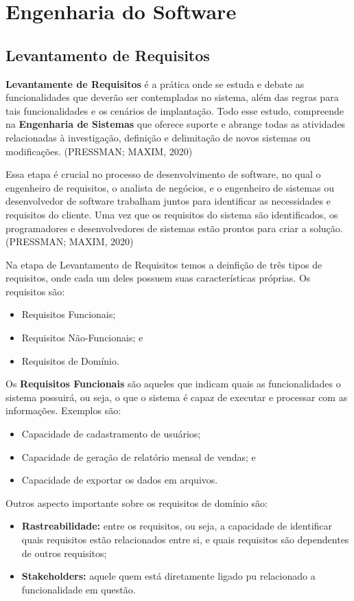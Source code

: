 \documentclass[a4paper,12pt]{article}
\begin{document}
\pagebreak
\section{Engenharia do Software}
\subsection{Levantamento de Requisitos}
\textbf{Levantamente de Requisitos} é a prática onde se estuda e debate as funcionalidades que deverão ser contempladas no sistema, 
além das regras para tais funcionalidades e os cenários de implantação. Todo esse estudo, compreende na \textbf{Engenharia de Sistemas} 
que oferece suporte e abrange todas as atividades relacionadas à investigação, definição e delimitação de novos sistemas ou modificações.
(PRESSMAN; MAXIM, 2020)

Essa etapa é crucial no processo de desenvolvimento de software, no qual o engenheiro de requisitos, o analista de negócios, e 
o engenheiro de sistemas ou desenvolvedor de software trabalham juntos para identificar as necessidades e requisitos do cliente. Uma 
vez que os requisitos do sistema são identificados, os programadores e desenvolvedores de sistemas estão prontos para criar a solução. (PRESSMAN; MAXIM, 2020)

Na etapa de Levantamento de Requisitos temos a deinfição de três tipos de requisitos, onde cada um deles possuem suas 
características próprias. Os requisitos são:
\begin{itemize}
	\item Requisitos Funcionais;
	\item Requisitos Não-Funcionais; e
	\item Requisitos de Domínio.
\end{itemize}

\vspace{1cm}
Os \textbf{Requisitos Funcionais} são aqueles que indicam quais as funcionalidades o sistema possuirá, ou seja, o que o sistema 
é capaz de executar e processar com as informações. Exemplos são:
\begin{itemize}
	\item Capacidade de cadastramento de usuários;
	\item Capacidade de geração de relatório mensal de vendas; e
	\item Capacidade de exportar os dados em arquivos.
\end{itemize}
Outros aspecto importante sobre os requisitos de domínio são: 
\begin{itemize}
	\item\textbf{Rastreabilidade:} entre os requisitos, ou seja, a capacidade de identificar quais requisitos estão 
	relacionados entre si, e quais requisitos são dependentes de outros requisitos;
	\item\textbf{Stakeholders:} aquele quem está diretamente ligado pu relacionado a funcionalidade em questão.
\end{itemize}
\end{document}
